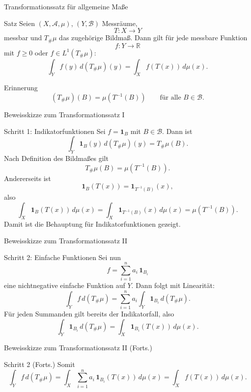 \documentclass{beamer}
\begin{document}
\begin{frame}{Transformationssatz für allgemeine Maße}
\begin{block}{Satz}
Seien \((X,\mathcal A,\mu)\), \((Y,\mathcal B)\) Messräume,
\[
T\colon X\to Y
\]
messbar und \(T_\#\mu\) das zugehörige Bildmaß.
Dann gilt für jede messbare Funktion
\[
f\colon Y\to\mathbb R
\]
mit \(f\ge 0\) oder \(f\in L^1(T_\#\mu)\):
\[
\int_Y f(y)\,d(T_\#\mu)(y)
=
\int_X f(T(x))\,d\mu(x).
\]
\end{block}
\begin{block}{Erinnerung}
\[
(T_\#\mu)(B)=\mu(T^{-1}(B))
\qquad\text{für alle } B\in\mathcal B.
\]
\end{block}
\end{frame}

\begin{frame}{Beweisskizze zum Transformationssatz I}
\begin{block}{Schritt 1: Indikatorfunktionen}
Sei \(f=\mathbf 1_B\) mit \(B\in\mathcal B\). Dann ist
\[
\int_Y \mathbf 1_B(y)\,d(T_\#\mu)(y)=T_\#\mu(B).
\]
Nach Definition des Bildmaßes gilt
\[
T_\#\mu(B)=\mu(T^{-1}(B)).
\]
Andererseits ist
\[
\mathbf 1_B(T(x))=
\mathbf 1_{T^{-1}(B)}(x),
\]
also
\[
\int_X \mathbf 1_B(T(x))\,d\mu(x)
=
\int_X \mathbf 1_{T^{-1}(B)}(x)\,d\mu(x)
=
\mu(T^{-1}(B)).
\]
Damit ist die Behauptung für Indikatorfunktionen gezeigt.
\end{block}
\end{frame}

\begin{frame}{Beweisskizze zum Transformationssatz II}
\begin{block}{Schritt 2: Einfache Funktionen}
Sei nun
\[
f=\sum_{i=1}^n a_i\,\mathbf 1_{B_i}
\]
eine nichtnegative einfache Funktion auf \(Y\).
Dann folgt mit Linearität:
\[
\int_Y f\,d(T_\#\mu)
=
\sum_{i=1}^n a_i \int_Y \mathbf 1_{B_i}\,d(T_\#\mu).
\]
Für jeden Summanden gilt bereits der Indikatorfall, also
\[
\int_Y \mathbf 1_{B_i}\,d(T_\#\mu)
=
\int_X \mathbf 1_{B_i}(T(x))\,d\mu(x).
\]
\end{block}
\end{frame}

\begin{frame}{Beweisskizze zum Transformationssatz II (Forts.)}
\begin{block}{Schritt 2 (Forts.)}
Somit
\[
\int_Y f\,d(T_\#\mu)
=
\int_X \sum_{i=1}^n a_i\,\mathbf 1_{B_i}(T(x))\,d\mu(x)
=
\int_X f(T(x))\,d\mu(x).
\]
\end{block}
\end{frame}
\end{document}
